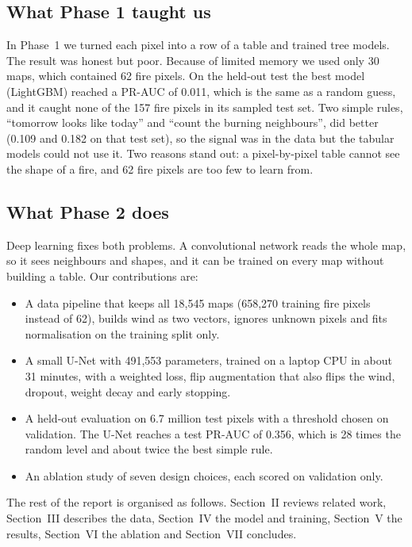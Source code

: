 \documentclass[10pt,letterpaper,twocolumn]{article}
\begin{document}
\subsection{What Phase 1 taught us}
In Phase~1 we turned each pixel into a row of a table and trained tree models.
The result was honest but poor. Because of limited memory we used only 30 maps,
which contained 62 fire pixels. On the held-out test the best model (LightGBM)
reached a PR-AUC of 0.011, which is the same as a random guess, and it caught
none of the 157 fire pixels in its sampled test set. Two simple rules,
``tomorrow looks like today'' and ``count the burning neighbours'', did better
(0.109 and 0.182 on that test set), so the signal was in the data but the
tabular models could not use it. Two reasons stand out: a pixel-by-pixel table
cannot see the shape of a fire, and 62 fire pixels are too few to learn from.

\subsection{What Phase 2 does}
Deep learning fixes both problems. A convolutional network reads the whole map,
so it sees neighbours and shapes, and it can be trained on every map without
building a table. Our contributions are:
\begin{itemize}
  \item A data pipeline that keeps all 18,545 maps (658,270 training fire pixels
        instead of 62), builds wind as two vectors, ignores unknown pixels and
        fits normalisation on the training split only.
  \item A small U-Net with 491,553 parameters, trained on a laptop CPU in about
        31 minutes, with a weighted loss, flip augmentation that also flips the
        wind, dropout, weight decay and early stopping.
  \item A held-out evaluation on 6.7 million test pixels with a threshold chosen
        on validation. The U-Net reaches a test PR-AUC of 0.356, which is 28
        times the random level and about twice the best simple rule.
  \item An ablation study of seven design choices, each scored on validation
        only.
\end{itemize}
The rest of the report is organised as follows. Section~II reviews related work,
Section~III describes the data, Section~IV the model and training, Section~V the
results, Section~VI the ablation and Section~VII concludes.
\end{document}
